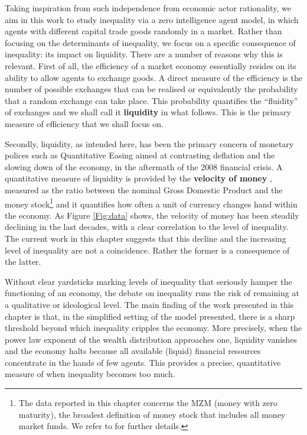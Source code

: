 Taking inspiration from such independence from economic actor rationality, we aim in this work to study inequality via a zero intelligence agent model, in which agents with different capital trade goods randomly in a market. Rather than focusing on the determinants of inequality, we focus on a specific consequence of inequality: its impact on liquidity. There are a number of reasons why this is relevant. First of all, the efficiency of a market economy essentially resides on its ability to allow agents to exchange goods. A direct measure of the efficiency is the number of possible exchanges that can be realised or equivalently the probability that a random exchange can take place. This probability quantifies the ``fluidity'' of exchanges and we shall call it \textbf{liquidity} in what follows. This is the primary measure of efficiency that we shall focus on. 

Secondly, liquidity, as intended here, has been the primary concern of monetary polices such as Quantitative Easing aimed at contrasting deflation and the slowing down of the economy, in the aftermath of the 2008 financial crisis. A quantitative measure of liquidity is provided by the \textbf{velocity of money} \cite{IFisher}, measured as the ratio between the nominal Gross Domestic Product and the money stock\footnote{The data reported in this chapter concerns the MZM (money with zero maturity), the broadest definition of money stock that includes all money market funds. We refer to \cite{FRED} for further details.} and it quantifies how often a unit of currency changes hand within the economy. As Figure \ref{Fig:data} shows, the velocity of money has been steadily declining in the last decades, with a clear correlation to the level of inequality. The current work in this chapter suggests that this decline and the increasing level of inequality are not a coincidence. Rather the former is a consequence of the latter. 

Without clear yardsticks marking levels of inequality that seriously hamper the functioning of an economy, the debate on inequality runs the risk of remaining at a qualitative or ideological level. The main finding of the work presented in this chapter is that, in the simplified setting of the model presented, there is a sharp threshold beyond which inequality cripples the economy. More precisely, when the power law exponent of the wealth distribution approaches one, liquidity vanishes and the economy halts because all available (liquid) financial resources concentrate in the hands of few agents. This provides a precise, quantitative measure of when inequality becomes too much. 

